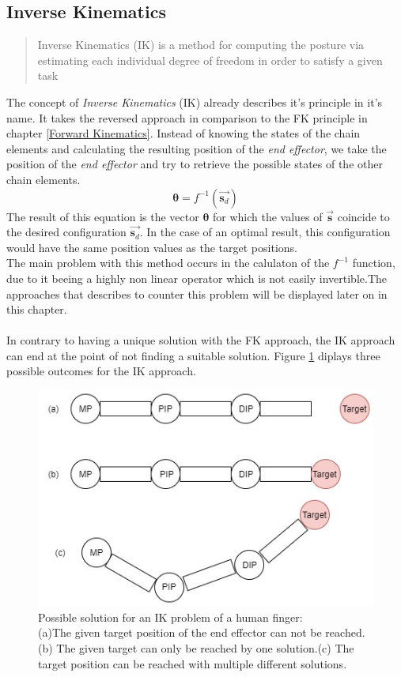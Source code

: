  \subsection{Inverse Kinematics}
 \label{inverse kinematics}
\begin{quote}Inverse Kinematics (IK) is a method for computing the posture via estimating each individual degree of freedom in order to satisfy a given task~\cite{AndreasAristidouandJoanLasenby.2009}\end{quote}
The concept of \textit{Inverse Kinematics}  (IK) already describes it's principle in it's name. It takes the reversed approach in comparison to the FK principle in chapter \ref{Forward Kinematics}. Instead of knowing the states of the chain elements and calculating the resulting position of the \textit{end effector}, we take the position of the \textit{end effector} and try to retrieve the possible states of the other chain elements. 
\begin{equation}
\label{ik problem formula}
\pmb{\theta}=f^{-1}(\vec{\textbf{s}_{d}})
\end{equation}
The result of this equation is the vector $\pmb{\theta}$ for which the values of $\vec{\textbf{s}}$ coincide to the desired configuration $\vec{\textbf{s}_{d}}$. In the case of an optimal result, this configuration would have the same position values as the target positions.\\ The main problem with this method occurs in the calulaton of the $f^{-1}$ function, due to it beeing a highly non linear operator which is not easily invertible.The approaches that \cite{AndreasAristidouandJoanLasenby.2009} describes to counter this problem will be displayed later on in this chapter.\\
\\In contrary to having a unique solution with the FK approach, the IK approach can end at the point of not finding a suitable solution. Figure \ref{IkSolutions} diplays three possible outcomes for the IK approach.
\begin{figure}[H]
\includegraphics[scale=0.6]{images/Ik_figure.jpg}
\caption{Possible solution for an IK problem of a human finger:\\(a)The given target position of the end effector can not be reached. (b) The given target can only be reached by one solution.(c) The target position can be reached with multiple different solutions.}
\label{IkSolutions}
\end{figure}
